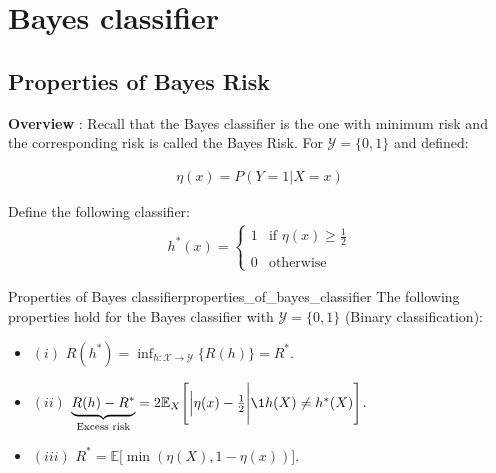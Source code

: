 \newpage
\section{Bayes classifier}

\subsection{Properties of Bayes Risk}
\textbf{Overview} : Recall that the Bayes classifier is the one with minimum risk and the corresponding risk is called the Bayes Risk. For $\mathcal{Y} = \{0,1 \}$ and defined:

\begin{align*}
    \eta(x) = P(Y=1|X=x)
\end{align*}

\noindent Define the following classifier:
\begin{align*}
    h^*(x) = \begin{cases}
        1 & \text{if } \eta(x) \ge \frac{1}{2}
        \\ \\
        0 & \text{otherwise}
    \end{cases}
\end{align*}

\begin{theorem}{Properties of Bayes classifier}{properties_of_bayes_classifier}
    The following properties hold for the Bayes classifier with $\mathcal{Y} = \{0,1\}$ (Binary classification):
    \begin{itemize}
        \item $(i)$ $R(h^*) = \inf_{h:\mathcal{X}\to\mathcal{Y}}\{ R(h) \} = R^*$.
        \item $(ii)$ $\underbrace{R(h) - R^*}_{\text{Excess risk}} = 2\mathbb{E}_X\Bigg[ \Big| \eta(x) - \frac{1}{2}\Bigg| \1{h(X)\ne h^*(X)} \Bigg]$.
        \item $(iii)$ $R^* = \mathbb{E}\Big[ \min(\eta(X), 1 - \eta(x)) \Big]$.
    \end{itemize}
\end{theorem}

